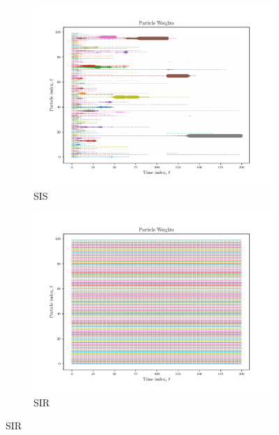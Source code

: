 \documentclass{article}
\begin{document}
\begin{figure}
    \begin{subfigure}{.5\textwidth}
        \includegraphics[width=\textwidth]{Figures/particle_weights_sis.pdf}
        \caption{SIS}
        \label{fig:sis-particle-weights}
    \end{subfigure}
    \begin{subfigure}{.5\textwidth}
        \includegraphics[width=\textwidth]{Figures/particle_weights_sir.pdf}
        \caption{SIR}
        \label{fig:sir-particle-weights}
    \end{subfigure}


\end{figure}
\end{document}
